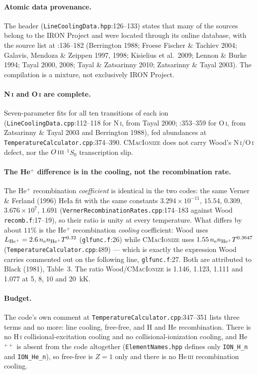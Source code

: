 \documentclass[english,a4paper]{my_memo}
\newcommand{\code}[1]{\texttt{#1}}
\newcommand{\CMI}{\textsc{CMacIonize}}
\newcommand{\HI}{H\,\textsc{i}}
\newcommand{\HeIII}{He\,\textsc{iii}}
\newcommand{\OI}{O\,\textsc{i}}
\newcommand{\OIII}{O\,\textsc{iii}}
\newcommand{\NI}{N\,\textsc{i}}
\newcommand{\nel}{n_{\rm e}}
\begin{document}
\paragraph{Atomic data provenance.}  The header
(\code{LineCoolingData.hpp}:126--133) states that many of the sources belong to
the IRON Project and were located through its online database, with the source
list at :136--182 (Berrington 1988; Froese Fischer \& Tachiev 2004; Galavis,
Mendoza \& Zeippen 1997, 1998; Kisielius et al.\ 2009; Lennon \& Burke 1994;
Tayal 2000, 2008; Tayal \& Zatsarinny 2010; Zatsarinny \& Tayal 2003).  The
compilation is a mixture, not exclusively IRON Project.

\paragraph{\NI{} and \OI{} are complete.}  Seven-parameter fits for all ten
transitions of each ion (\code{LineCoolingData.cpp}:112--118 for \NI{}, from
Tayal 2000; :353--359 for \OI{}, from Zatsarinny \& Tayal 2003 and Berrington
1988), fed abundances at \code{TemperatureCalculator.cpp}:374--390.  \CMI{}
does not carry Wood's \NI{}/\OI{} defect, nor the $\OIII{}$ $^1S_0$
transcription slip.

\paragraph{The He$^+$ difference is in the cooling, not the recombination
rate.}  The He$^+$ recombination \emph{coefficient} is identical in the two
codes: the same Verner \& Ferland (1996) HeIa fit with the same constants
$3.294\times10^{-11}$, $15.54$, $0.309$, $3.676\times10^{7}$, $1.691$
(\code{VernerRecombinationRates.cpp}:174--183 against Wood
\code{recomb.f}:17--19), so their ratio is unity at every temperature.  What
differs by about $11\%$ is the He$^+$ recombination \emph{cooling}
coefficient: Wood uses $L_{\rm He^+} = 2.6\,\nel n_{\rm He^+} T^{0.32}$
(\code{glfunc.f}:26) while \CMI{} uses $1.55\,\nel n_{\rm He^+} T^{0.3647}$
(\code{TemperatureCalculator.cpp}:489) --- which is exactly the expression Wood
carries commented out on the following line, \code{glfunc.f}:27.  Both are
attributed to Black (1981), Table~3.  The ratio Wood/\CMI{} is 1.146, 1.123,
1.111 and 1.077 at 5, 8, 10 and 20~kK.

\paragraph{Budget.}  The code's own comment at
\code{TemperatureCalculator.cpp}:347--351 lists three terms and no more: line
cooling, free-free, and H and He recombination.  There is no \HI{}
collisional-excitation cooling and no collisional-ionization cooling, and
He$^{++}$ is absent from the code altogether (\code{ElementNames.hpp} defines
only \code{ION\_H\_n} and \code{ION\_He\_n}), so free-free is $Z = 1$ only and
there is no \HeIII{} recombination cooling.
\end{document}
